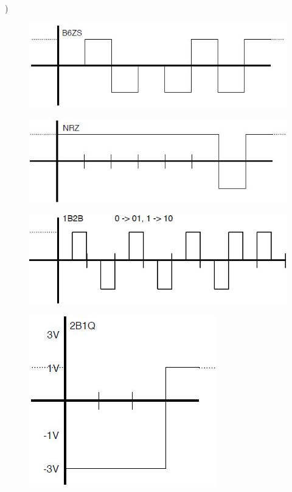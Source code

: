 \documentclass[12pt]{article}
\begin{document}
)\\
\begin{figure}[h!]
  \centering
  \includegraphics[scale=.8]{B6ZS.JPG}
\end{figure}
\begin{figure}[h!]
  \centering
  \includegraphics[scale=.8]{NRZI.JPG}
\end{figure}
\begin{figure}[h!]
  \centering
  \includegraphics[scale=.8]{1B2B.JPG}
\end{figure}
\begin{figure}[h!]
  \centering
  \includegraphics[scale=.8]{2B1Q.JPG}
\end{figure}
\end{document}
